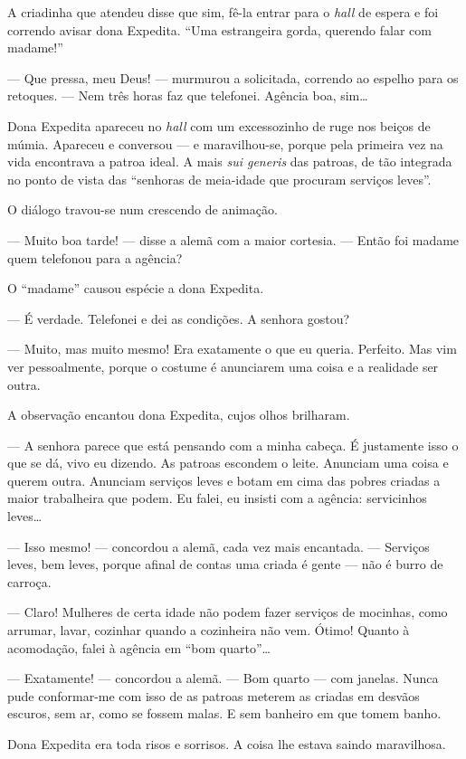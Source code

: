 A criadinha que atendeu disse que sim, fê-la entrar para o \emph{hall}
de espera e foi correndo avisar dona Expedita. ``Uma estrangeira gorda,
querendo falar com madame!''

--- Que pressa, meu Deus! --- murmurou a solicitada, correndo ao espelho
para os retoques. --- Nem três horas faz que telefonei. Agência boa,
sim\ldots{}

Dona Expedita apareceu no \emph{hall} com um excessozinho de ruge nos
beiços de múmia. Apareceu e conversou --- e maravilhou-se, porque pela
primeira vez na vida encontrava a patroa ideal. A mais \emph{sui
generis} das patroas, de tão integrada no ponto de vista das ``senhoras
de meia-idade que procuram serviços leves''.

O diálogo travou-se num crescendo de animação.

--- Muito boa tarde! --- disse a alemã com a maior cortesia. --- Então
foi madame quem telefonou para a agência?

O ``madame'' causou espécie a dona Expedita.

--- É verdade. Telefonei e dei as condições. A senhora gostou?

--- Muito, mas muito mesmo! Era exatamente o que eu queria. Perfeito.
Mas vim ver pessoalmente, porque o costume é anunciarem uma coisa e a
realidade ser outra.

A observação encantou dona Expedita, cujos olhos brilharam.

--- A senhora parece que está pensando com a minha cabeça. É justamente
isso o que se dá, vivo eu dizendo. As patroas escondem o leite. Anunciam
uma coisa e querem outra. Anunciam serviços leves e botam em cima das
pobres criadas a maior trabalheira que podem. Eu falei, eu insisti com a
agência: servicinhos leves\ldots{}

--- Isso mesmo! --- concordou a alemã, cada vez mais encantada. ---
Serviços leves, bem leves, porque afinal de contas uma criada é gente
--- não é burro de carroça.

--- Claro! Mulheres de certa idade não podem fazer serviços de mocinhas,
como arrumar, lavar, cozinhar quando a cozinheira não vem. Ótimo! Quanto
à acomodação, falei à agência em ``bom quarto''\ldots{}

--- Exatamente! --- concordou a alemã. --- Bom quarto --- com janelas.
Nunca pude conformar-me com isso de as patroas meterem as criadas em
desvãos escuros, sem ar, como se fossem malas. E sem banheiro em que
tomem banho.

Dona Expedita era toda risos e sorrisos. A coisa lhe estava saindo
maravilhosa.

